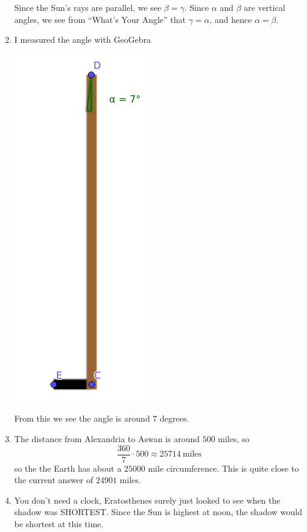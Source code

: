 \documentclass[noauthor,nooutcomes,handout]{ximera}
\begin{document}
\begin{question}
\begin{freeResponse}
\begin{enumerate}
\begin{center}
        \end{center}
        Since the Sun's rays are parallel, we see
            $\beta=\gamma$. Since $\alpha$ and $\beta$ are vertical
        angles, we see from ``What's Your Angle'' that $\gamma =
        \alpha$, and hence $\alpha = \beta$.
      \item I measured the angle with GeoGebra
        \begin{center}
          \includegraphics[width=.2\textwidth]{shadowFax.png}
        \end{center}
        From this we see the angle is around $7$ degrees.
      \item The distance from Alexandria to Aswan is around $500$
        miles, so
        \[
        \frac{360}{7}\cdot 500 \approx 25714~\text{miles}
        \]
        so the the Earth has about a $25000$ mile circumference. This is quite close to the current answer of $24901$ miles.
      \item You don't need a clock, Eratosthenes surely just looked to
        see when the shadow was SHORTEST. Since the Sun is highest at
        noon, the shadow would be shortest at this time.
    \end{enumerate}
  \end{freeResponse}
\end{question}
\mynewpage
\end{document}

